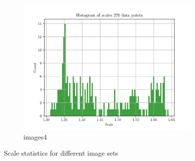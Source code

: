 \documentclass{article}
\begin{document}
\begin{figure}[h!]
\begin{subfigure}{0.5\textwidth}
		\includegraphics[width=0.9\linewidth]{stats_images4_rgb}
		\caption{images4}		
		\label{fig:stats_images4_rgb}
	\end{subfigure}
	\caption{Scale statistics for different image sets}
	\label{fig:scale_stats}
\end{figure}




\end{document}
